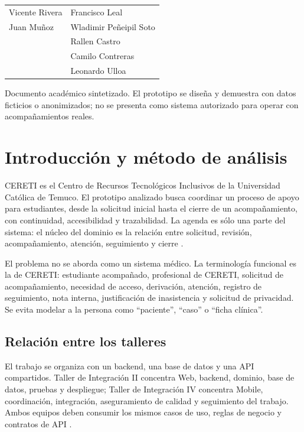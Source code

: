 \documentclass[10pt,a4paper,oneside]{article}
\begin{document}
\begin{titlepage}
\begin{minipage}{0.86\textwidth}
\begin{tabular}{@{}p{5.8cm}p{6.8cm}@{}}
      Vicente Rivera & Francisco Leal\\
      Juan Muñoz & Wladimir Peñeipil Soto\\
      & Rallen Castro\\
      & Camilo Contreras\\
      & Leonardo Ulloa
    \end{tabular}
  \end{minipage}\par
  \vfill
  \noindent\hspace*{0.9cm}\begin{minipage}{0.86\textwidth}\small\color{gristexto}
    Documento académico sintetizado. El prototipo se diseña y demuestra con datos ficticios o anonimizados; no se presenta como sistema autorizado para operar con acompañamientos reales.
  \end{minipage}
\end{titlepage}

\tableofcontents
\clearpage
{}

\section{Introducción y método de análisis}

CERETI es el Centro de Recursos Tecnológicos Inclusivos de la Universidad Católica de Temuco. El prototipo analizado busca coordinar un proceso de apoyo para estudiantes, desde la solicitud inicial hasta el cierre de un acompañamiento, con continuidad, accesibilidad y trazabilidad. La agenda es sólo una parte del sistema: el núcleo del dominio es la relación entre solicitud, revisión, acompañamiento, atención, seguimiento y cierre \citep{context,especificacion}.

El problema no se aborda como un sistema médico. La terminología funcional es la de CERETI: estudiante acompañado, profesional de CERETI, solicitud de acompañamiento, necesidad de acceso, derivación, atención, registro de seguimiento, nota interna, justificación de inasistencia y solicitud de privacidad. Se evita modelar a la persona como ``paciente'', ``caso'' o ``ficha clínica''.

\subsection{Relación entre los talleres}

El trabajo se organiza con un backend, una base de datos y una API compartidos. Taller de Integración II concentra Web, backend, dominio, base de datos, pruebas y despliegue; Taller de Integración IV concentra Mobile, coordinación, integración, aseguramiento de calidad y seguimiento del trabajo. Ambos equipos deben consumir los mismos casos de uso, reglas de negocio y contratos de API \citep{metodologia,tech,git}.
\end{document}
